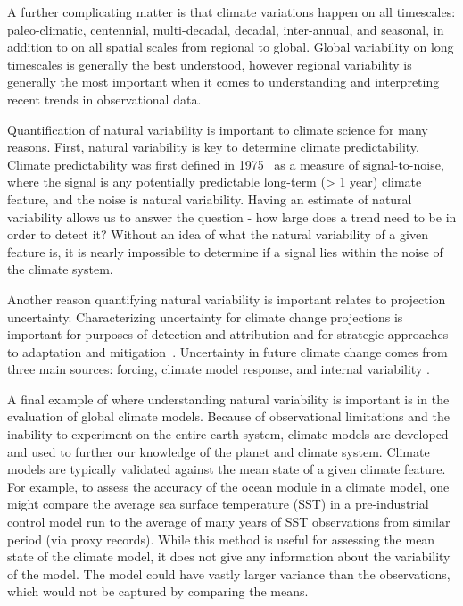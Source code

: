 A further complicating matter is that climate variations happen on all timescales:
paleo-climatic, centennial, multi-decadal, decadal, inter-annual, and seasonal, in
addition to on all spatial scales from regional to global. Global variability on
long timescales is generally the best understood, however regional variability is
generally the most important when it comes to understanding and interpreting recent
trends in observational data.

Quantification of natural variability is important to climate science for many
reasons. First, natural variability is key to determine climate predictability.
Climate predictability was first defined in 1975~\citep{TheNationalAcademyofScience1975}
as a measure of signal-to-noise, where the signal is any potentially predictable
long-term (> 1 year) climate feature, and the noise is natural variability. Having
an estimate of natural variability allows us to answer the question - how large
does a trend need to be in order to detect it? Without an idea of what the natural
variability of a given feature is, it is nearly impossible to determine if a
signal lies within the noise of the climate system.

Another reason quantifying natural variability is important relates to projection
uncertainty. Characterizing uncertainty for climate change projections is important
for purposes of detection and attribution and for strategic approaches to adaptation
and mitigation~\citep{Deser2012}. Uncertainty in future climate change comes from
three main sources: forcing, climate model response, and internal variability
\citep{Lovenduski2015,Hawkins2009,Tebaldi2007}.

A final example of where understanding natural variability is important is in the
evaluation of global climate models. Because of observational limitations and the
inability to experiment on the entire earth system, climate models are developed
and used to further our knowledge of the planet and climate system. Climate models
are typically validated against the mean state of a given climate feature. For
example, to assess the accuracy of the ocean module in a climate model, one might
compare the average sea surface temperature (SST) in a pre-industrial control model
run to the average of many years of SST observations from similar period (via proxy
records). While this method is useful for assessing the mean state of the climate
model, it does not give any information about the variability of the model. The
model could have vastly larger variance than the observations, which would not be
captured by comparing the means.

